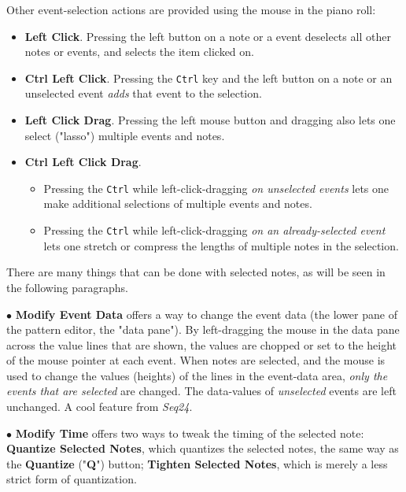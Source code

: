    Other event-selection actions are provided using the mouse in the piano roll:

   \begin{itemize}
      \item {}
         \textbf{Left Click}.
         Pressing the left button on a note or a event deselects all other
         notes or events, and selects the item clicked on.
      \item {}
         \textbf{Ctrl Left Click}.
         Pressing the \texttt{Ctrl} key and the left button on a note or an
         unselected event \textsl{adds} that event to the selection.
      \item {}
         \textbf{Left Click Drag}.
         Pressing the left mouse button and dragging also lets one
         select ("lasso") multiple events and notes.
      \item {}
         \textbf{Ctrl Left Click Drag}.
         \begin{itemize}
            \item Pressing the \texttt{Ctrl} while left-click-dragging
               \textsl{on unselected events} lets one make additional
               selections of multiple events and notes.
            \item Pressing the \texttt{Ctrl} while left-click-dragging
               \textsl{on an already-selected event} lets one stretch or
               compress the lengths of multiple notes in the selection.
         \end{itemize}
   \end{itemize}

   There are many things that can be done with selected notes, as will be seen
   in the following paragraphs.

   $\bullet$ \textbf{Modify Event Data} offers a way to change the event data
   (the lower pane of the pattern editor, the "data pane").
   By left-dragging the mouse in the data pane across the value lines that are
   shown, the values are chopped or set to the height of the mouse pointer at
   each event.
   When notes are selected, and the
   mouse is used to change the values (heights) of the lines in the event-data
   area,
   \textsl{only the events that are selected} are changed.  The data-values of
   \textsl{unselected} events are left unchanged.
   A cool feature from \textsl{Seq24}.

   $\bullet$ \textbf{Modify Time} offers two ways to tweak the timing of the
   selected note:
   \textbf{Quantize Selected Notes}, which quantizes the selected
   notes, the same way as the \textbf{Quantize} ("\textbf{Q}") button;
   \textbf{Tighten Selected Notes}, which is merely a less
   strict form of quantization.

